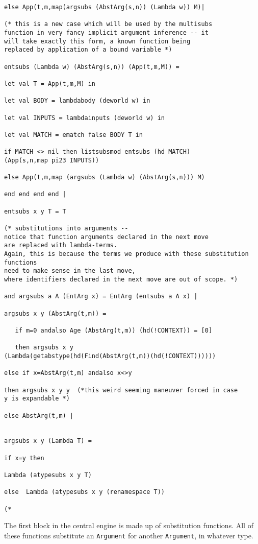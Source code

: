 \documentclass{article}
\begin{document}
\begin{verbatim}
else App(t,m,map(argsubs (AbstArg(s,n)) (Lambda w)) M)|

(* this is a new case which will be used by the multisubs
function in very fancy implicit argument inference -- it
will take exactly this form, a known function being
replaced by application of a bound variable *) 

entsubs (Lambda w) (AbstArg(s,n)) (App(t,m,M)) =

let val T = App(t,m,M) in 

let val BODY = lambdabody (deworld w) in

let val INPUTS = lambdainputs (deworld w) in

let val MATCH = ematch false BODY T in

if MATCH <> nil then listsubsmod entsubs (hd MATCH) 
(App(s,n,map pi23 INPUTS))

else App(t,m,map (argsubs (Lambda w) (AbstArg(s,n))) M)

end end end end |

entsubs x y T = T

(* substitutions into arguments -- 
notice that function arguments declared in the next move 
are replaced with lambda-terms.  
Again, this is because the terms we produce with these substitution functions 
need to make sense in the last move, 
where identifiers declared in the next move are out of scope. *)

and argsubs a A (EntArg x) = EntArg (entsubs a A x) |

argsubs x y (AbstArg(t,m)) =

   if m=0 andalso Age (AbstArg(t,m)) (hd(!CONTEXT)) = [0]

   then argsubs x y 
(Lambda(getabstype(hd(Find(AbstArg(t,m))(hd(!CONTEXT))))))

else if x=AbstArg(t,m) andalso x<>y

then argsubs x y y  (*this weird seeming maneuver forced in case
y is expandable *)

else AbstArg(t,m) |


argsubs x y (Lambda T) = 

if x=y then

Lambda (atypesubs x y T)

else  Lambda (atypesubs x y (renamespace T))

(*

\end{verbatim}

The first block in the central engine is made up of substitution functions.  All of these functions substitute an {\tt Argument} for another
{\tt Argument}, in whatever type.
\end{document}
